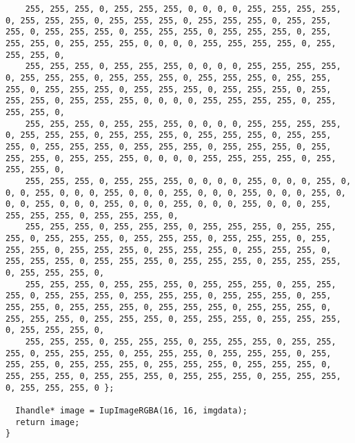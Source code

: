 \documentclass{ctexart}
\begin{document}
\begin{lstlisting}
    255, 255, 255, 0, 255, 255, 255, 0, 0, 0, 0, 255, 255, 255, 255, 0, 255, 255, 255, 0, 255, 255, 255, 0, 255, 255, 255, 0, 255, 255, 255, 0, 255, 255, 255, 0, 255, 255, 255, 0, 255, 255, 255, 0, 255, 255, 255, 0, 255, 255, 255, 0, 0, 0, 0, 255, 255, 255, 255, 0, 255, 255, 255, 0,
    255, 255, 255, 0, 255, 255, 255, 0, 0, 0, 0, 255, 255, 255, 255, 0, 255, 255, 255, 0, 255, 255, 255, 0, 255, 255, 255, 0, 255, 255, 255, 0, 255, 255, 255, 0, 255, 255, 255, 0, 255, 255, 255, 0, 255, 255, 255, 0, 255, 255, 255, 0, 0, 0, 0, 255, 255, 255, 255, 0, 255, 255, 255, 0,
    255, 255, 255, 0, 255, 255, 255, 0, 0, 0, 0, 255, 255, 255, 255, 0, 255, 255, 255, 0, 255, 255, 255, 0, 255, 255, 255, 0, 255, 255, 255, 0, 255, 255, 255, 0, 255, 255, 255, 0, 255, 255, 255, 0, 255, 255, 255, 0, 255, 255, 255, 0, 0, 0, 0, 255, 255, 255, 255, 0, 255, 255, 255, 0,
    255, 255, 255, 0, 255, 255, 255, 0, 0, 0, 0, 255, 0, 0, 0, 255, 0, 0, 0, 255, 0, 0, 0, 255, 0, 0, 0, 255, 0, 0, 0, 255, 0, 0, 0, 255, 0, 0, 0, 255, 0, 0, 0, 255, 0, 0, 0, 255, 0, 0, 0, 255, 0, 0, 0, 255, 255, 255, 255, 0, 255, 255, 255, 0,
    255, 255, 255, 0, 255, 255, 255, 0, 255, 255, 255, 0, 255, 255, 255, 0, 255, 255, 255, 0, 255, 255, 255, 0, 255, 255, 255, 0, 255, 255, 255, 0, 255, 255, 255, 0, 255, 255, 255, 0, 255, 255, 255, 0, 255, 255, 255, 0, 255, 255, 255, 0, 255, 255, 255, 0, 255, 255, 255, 0, 255, 255, 255, 0,
    255, 255, 255, 0, 255, 255, 255, 0, 255, 255, 255, 0, 255, 255, 255, 0, 255, 255, 255, 0, 255, 255, 255, 0, 255, 255, 255, 0, 255, 255, 255, 0, 255, 255, 255, 0, 255, 255, 255, 0, 255, 255, 255, 0, 255, 255, 255, 0, 255, 255, 255, 0, 255, 255, 255, 0, 255, 255, 255, 0, 255, 255, 255, 0,
    255, 255, 255, 0, 255, 255, 255, 0, 255, 255, 255, 0, 255, 255, 255, 0, 255, 255, 255, 0, 255, 255, 255, 0, 255, 255, 255, 0, 255, 255, 255, 0, 255, 255, 255, 0, 255, 255, 255, 0, 255, 255, 255, 0, 255, 255, 255, 0, 255, 255, 255, 0, 255, 255, 255, 0, 255, 255, 255, 0, 255, 255, 255, 0 };

  Ihandle* image = IupImageRGBA(16, 16, imgdata);
  return image;
}


\end{lstlisting}
\end{document}
